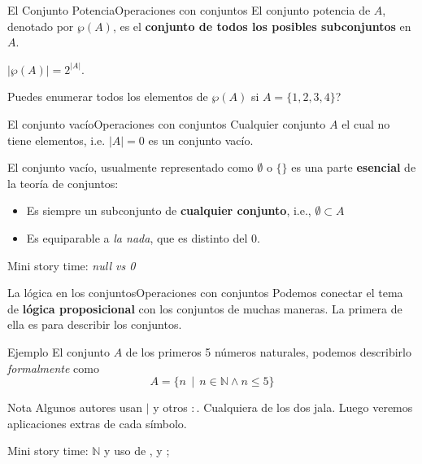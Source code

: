 \documentclass[spanish, c]{beamer}
\begin{document}
\begin{frame}{El Conjunto Potencia}{Operaciones con conjuntos}
    El \alert{conjunto potencia}  de $A$, denotado por $\wp(A)$, es el \textbf{conjunto de todos los posibles subconjuntos} en $A$. \pause

    \bigskip

    \begin{theorem}
        $\vert \wp(A) \vert = 2^{\vert A \vert}$.
    \end{theorem} \pause

    \bigskip

    Puedes enumerar todos los elementos de $\wp(A)$ si $A = \{1, 2, 3, 4\}$?
\end{frame}

\begin{frame}{El conjunto vacío}{Operaciones con conjuntos}
    Cualquier conjunto $A$ el cual no tiene elementos, i.e. $\vert A \vert = 0$ es un \alert{conjunto vacío}. \pause

    \bigskip

    El conjunto vacío, usualmente representado como $\emptyset$ o $\{\}$ es una parte \textbf{esencial} de la teoría de conjuntos: \pause

    \begin{itemize}[<+->]
        \item Es siempre un subconjunto de \textbf{cualquier conjunto}, i.e., $\emptyset \subset A$
        \item Es equiparable a \textit{la nada}, que es distinto del 0.
    \end{itemize} \pause

    \bigskip

    {\Large Mini story time: \textit{null vs 0}}

\end{frame}

\begin{frame}{La lógica en los conjuntos}{Operaciones con conjuntos}
    Podemos conectar el tema de \textbf{lógica proposicional} con los conjuntos de muchas maneras.
    La primera de ella es para \alert{describir} los conjuntos. \pause

    \begin{exampleblock}{Ejemplo}
        El conjunto $A$ de los primeros 5 números naturales, podemos describirlo \textit{formalmente} como
        $$A = \{n \, \mid \, n \in \mathbb{N} \wedge n \leq 5 \}$$
    \end{exampleblock} \pause

    \begin{block}{Nota}
        Algunos autores usan $\mid$ y otros $:$.
        Cualquiera de los dos jala. Luego veremos aplicaciones extras de cada símbolo.
    \end{block}
    \bigskip
    {\Large Mini story time: \textit{$\mathbb{N}$} y uso de , y ;}
\end{frame}
\end{document}
